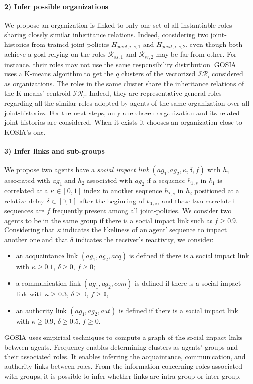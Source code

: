 \documentclass[runningheads]{llncs}
\newcounter{relation}
\begin{document}
\paragraph{2) Infer possible organizations}

We propose an organization is linked to only one set of all instantiable roles sharing closely similar inheritance relations. Indeed, considering two joint-histories from trained joint-policies $H_{joint,i,s,1}$ and $H_{joint,i,s,2}$, even though both achieve a goal relying on the roles $\mathcal{R}_{ss,1}$ and $\mathcal{R}_{ss,2}$ may be far from other. For instance, their roles may not use the same responsibility distribution.
GOSIA uses a K-means algorithm to get the $q$ clusters of the vectorized $\mathcal{IR}_{i}$ considered as organizations. The roles in the same cluster share the inheritance relations of the K-means' centroid $\mathcal{IR}_j$. Indeed, they are representative general roles regarding all the similar roles adopted by agents of the same organization over all joint-histories.
For the next steps, only one chosen organization and its related joint-histories are considered. When it exists it chooses an organization close to KOSIA's one.

\paragraph{3) Infer links and sub-groups}

We propose two agents have a \emph{social impact link} $(ag_1,ag_2, \kappa, \delta, f)$ with $h_1$ associated with $ag_1$ and $h_2$ associated with $ag_2$ if a sequence $h_{1,s}$ in $h_1$ is correlated at a $\kappa \in [0,1]$ index to another sequence $h_{2,s}$ in $h_2$ positioned at a relative delay $\delta \in [0,1]$ after the beginning of $h_{1,s}$, and these two correlated sequences are $f$ frequently present among all joint-policies.
We consider two agents to be in the same group if there is a social impact link such as $f \geq 0.9$. Considering that $\kappa$ indicates the likeliness of an agent' sequence to impact another one and that $\delta$ indicates the receiver's reactivity, we consider:
\begin{itemize}
    \item an acquaintance link $(ag_1,ag_2,acq)$ is defined if there is a social impact link with $\kappa \geq 0.1$, $\delta \geq 0$, $f \geq 0$;
    \item a communication link $(ag_1,ag_2,com)$ is defined if there is a social impact link with $\kappa \geq 0.3$, $\delta \geq 0$, $f \geq 0$;
    \item an authority link $(ag_1,ag_2,aut)$ is defined if there is a social impact link with $\kappa \geq 0.9$, $\delta \geq 0.5$, $f \geq 0$.
\end{itemize}
GOSIA uses empirical techniques to compute a graph of the social impact links between agents. Frequency enables determining clusters as agents' groups and their associated roles. It enables inferring the acquaintance, communication, and authority links between roles. From the information concerning roles associated with groups, it is possible to infer whether links are intra-group or inter-group.
\end{document}
